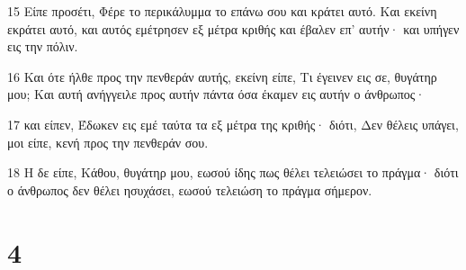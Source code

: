 \par 15 Είπε προσέτι, Φέρε το περικάλυμμα το επάνω σου και κράτει αυτό. Και εκείνη εκράτει αυτό, και αυτός εμέτρησεν εξ μέτρα κριθής και έβαλεν επ' αυτήν· και υπήγεν εις την πόλιν.
\par 16 Και ότε ήλθε προς την πενθεράν αυτής, εκείνη είπε, Τι έγεινεν εις σε, θυγάτηρ μου; Και αυτή ανήγγειλε προς αυτήν πάντα όσα έκαμεν εις αυτήν ο άνθρωπος·
\par 17 και είπεν, Έδωκεν εις εμέ ταύτα τα εξ μέτρα της κριθής· διότι, Δεν θέλεις υπάγει, μοι είπε, κενή προς την πενθεράν σου.
\par 18 Η δε είπε, Κάθου, θυγάτηρ μου, εωσού ίδης πως θέλει τελειώσει το πράγμα· διότι ο άνθρωπος δεν θέλει ησυχάσει, εωσού τελειώση το πράγμα σήμερον.

\chapter{4}

